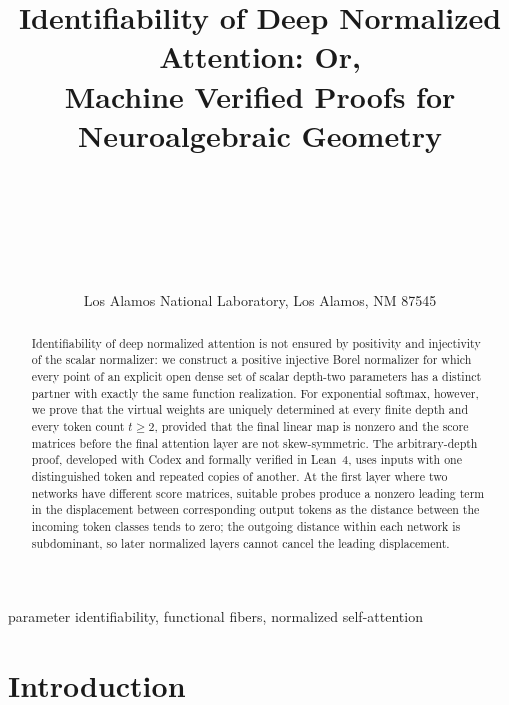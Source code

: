 \documentclass[mlmain]{jmlr}
\title[Identifiability of Deep Normalized Attention]
{Identifiability of Deep Normalized Attention: Or,\\ Machine Verified Proofs for Neuroalgebraic Geometry
}
\author{%
  \Name{James Amarel} \Email{jlamarel@lanl.gov} \\
  \Name{Benjamin Migliori} \Email{ben.migliori@lanl.gov}\\
  \Name{Nathan Debardeleben}  \Email{ndebard@lanl.gov}\\
  \Name{Emily Taylor} \Email{ecasleton@lanl.gov}\\
  \Name{Earl Lawrence} \Email{earl@lanl.gov}\\
  \Name{Gerd J. Kunde} \Email{g.j.kunde@lanl.gov}\\
  \addr Los Alamos National Laboratory, Los Alamos, NM 87545
}
\begin{document}
\maketitle

\begin{abstract}
    Identifiability of deep normalized attention is not ensured by
positivity and injectivity of the scalar normalizer: we construct a positive injective Borel
normalizer for which every point of an explicit open dense set of scalar depth-two parameters has a distinct partner
with exactly the same function realization.  For exponential softmax, however, we prove that the
virtual weights are uniquely determined at every finite depth and every token
count $t\ge2$, provided that the final linear map is nonzero and the score
matrices before the final attention layer are not skew-symmetric.  The
arbitrary-depth proof, developed with Codex and formally verified in Lean~4,
uses inputs with one distinguished token and repeated copies of another.
At the first layer where two networks have different score matrices, suitable
probes produce a nonzero leading term in the displacement between
corresponding output tokens as the distance between the incoming token
classes tends to zero; the outgoing distance within each network is subdominant,
so later normalized layers cannot cancel the leading displacement.

\end{abstract}

\begin{keywords}
parameter identifiability, functional fibers, normalized self-attention
\end{keywords}

\section{Introduction}
\label{sec:introduction}
\end{document}
